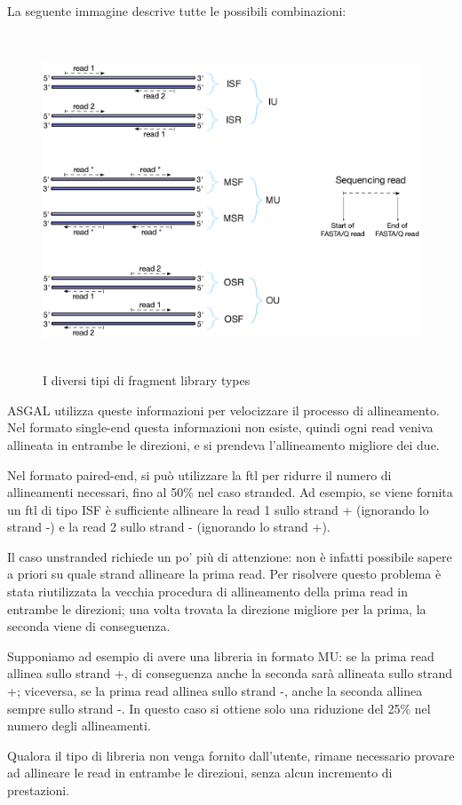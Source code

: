 La seguente immagine descrive tutte le possibili combinazioni:
\begin{figure}[h!]
	\centering
	\includegraphics[width=\linewidth, height=10cm]{images/fragmentlibrarytypes.png}
  \caption{I diversi tipi di fragment library types}
  \label{fig:FragmentLibraryTypes}
\end{figure}

\newpage

ASGAL utilizza queste informazioni per velocizzare il processo di allineamento. Nel formato single-end questa informazioni non esiste, quindi ogni read veniva allineata in entrambe le direzioni, e si prendeva l'allineamento migliore dei due. 

Nel formato paired-end, si può utilizzare la ftl per ridurre il numero di allineamenti necessari, fino al 50\% nel caso stranded. Ad esempio, se viene fornita un ftl di tipo ISF è sufficiente allineare la read 1 sullo strand + (ignorando lo strand -) e la read 2 sullo strand - (ignorando lo strand +).

Il caso unstranded richiede un po' più di attenzione: non è infatti possibile sapere a priori su quale strand allineare la prima read. Per risolvere questo problema è stata riutilizzata la vecchia procedura di allineamento della prima read in entrambe le direzioni; una volta trovata la direzione migliore per la prima, la seconda viene di conseguenza. 

Supponiamo ad esempio di avere una libreria in formato MU: se la prima read allinea sullo strand +, di conseguenza anche la seconda sarà allineata sullo strand +; viceversa, se la prima read allinea sullo strand -, anche la seconda allinea sempre sullo strand -. In questo caso si ottiene solo una riduzione del 25\% nel numero degli allineamenti.

Qualora il tipo di libreria non venga fornito dall'utente, rimane necessario provare ad allineare le read in entrambe le direzioni, senza alcun incremento di prestazioni.


